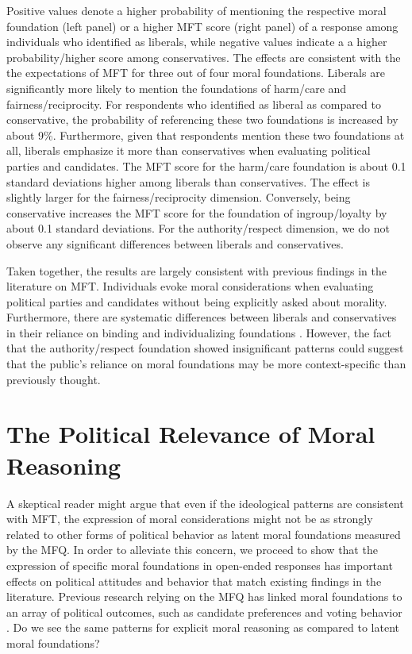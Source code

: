\documentclass[12pt]{article}
\begin{document}
Positive values denote a higher probability of mentioning the respective moral foundation (left panel) or a higher MFT score (right panel) of a response among individuals who identified as liberals, while negative values indicate a a higher probability/higher score among conservatives. The effects are consistent with the the expectations of MFT for three out of four moral foundations. Liberals are significantly more likely to mention the foundations of harm/care and fairness/reciprocity. For respondents who identified as liberal as compared to conservative, the probability of referencing these two foundations is increased by about 9\%. Furthermore, given that respondents mention these two foundations at all, liberals emphasize it more than conservatives when evaluating political parties and candidates. The MFT score for the harm/care foundation is about 0.1 standard deviations higher among liberals than conservatives. The effect is slightly larger for the fairness/reciprocity dimension. Conversely, being conservative increases the MFT score for the foundation of ingroup/loyalty by about 0.1 standard deviations. For the authority/respect dimension, we do not observe any significant differences between liberals and conservatives.

Taken together, the results are largely consistent with previous findings in the literature on MFT. Individuals evoke moral considerations when evaluating political parties and candidates without being explicitly asked about morality. Furthermore, there are systematic differences between liberals and conservatives in their reliance on binding and individualizing foundations \citep[see][for similar ideological differences when analyzing the content of life-narrative interviews]{mcadams2008family}. However, the fact that the authority/respect foundation showed insignificant patterns could suggest that the public's reliance on moral foundations may be more context-specific than previously thought.


\section*{The Political Relevance of Moral Reasoning}

A skeptical reader might argue that even if the ideological patterns are consistent with MFT, the expression of moral considerations might not be as strongly related to other forms of political behavior as latent moral foundations measured by the MFQ. In order to alleviate this concern, we proceed to show that the expression of specific moral foundations in open-ended responses has important effects on political attitudes and behavior that match existing findings in the literature. Previous research relying on the MFQ has linked moral foundations to an array of political outcomes, such as candidate preferences \citep{iyer2010beyond} and voting behavior \citep{franks2015using}. Do we see the same patterns for explicit moral reasoning as compared to latent moral foundations?
\end{document}
